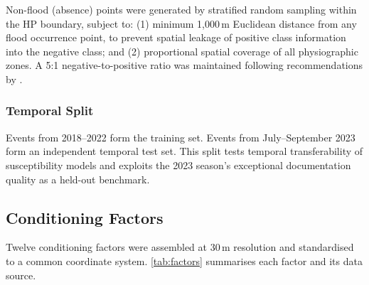 Non-flood (absence) points were generated by stratified random sampling
within the HP boundary, subject to: (1) minimum 1,000\,m Euclidean distance
from any flood occurrence point, to prevent spatial leakage of positive class
information into the negative class; and (2) proportional spatial coverage
of all physiographic zones.
A 5:1 negative-to-positive ratio was maintained following recommendations
by \citet{dataquality2025}.

\subsubsection{Temporal Split}
\label{sec:temporal_split}

Events from 2018--2022 form the training set.
Events from July--September 2023 form an independent temporal test set.
This split tests temporal transferability of susceptibility models
\citep{ghosh2023karnali} and exploits the 2023 season's exceptional documentation
quality as a held-out benchmark.

\subsection{Conditioning Factors}
\label{sec:factors}

Twelve conditioning factors were assembled at 30\,m resolution
and standardised to a common coordinate system.
\cref{tab:factors} summarises each factor and its data source.

